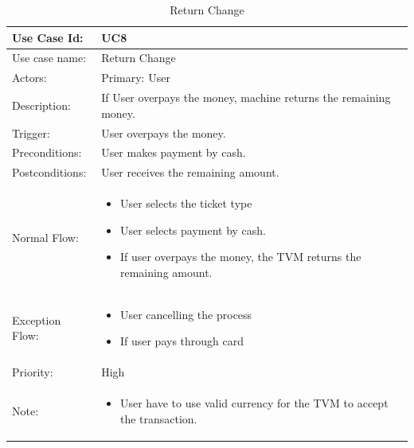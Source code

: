 \documentclass[11pt,oneside]{book}
\begin{document}
\begin{table}[h]
\centering
\begin{tabular}{|p{2.4cm}|p{11cm}|}
\hline
{Use Case Id: } & {UC8} \\
\hline
{Use case name:} & {Return Change}\\
\hline
{Actors: } & {Primary: User}\\
\hline
{Description:} & {If User overpays the money, machine returns the remaining money. }\\
\hline
 
{Trigger:  } & {User overpays the money.}\\
\hline
{Preconditions:  } & {User makes payment by cash.}\\
\hline
{Postconditions:} & {User receives the remaining amount.}\\
\hline
{Normal Flow: } & {
\begin{itemize}

\item	User selects the ticket type
\item	User selects payment by cash.
\item	If user overpays the money, the TVM returns the remaining amount.



 
\end{itemize}
}\\
\hline
{Exception Flow: } & {
\begin{itemize}

\item	User cancelling the process
\item	If user pays through card


\end{itemize}
}\\
\hline
{Priority:  } & {High}\\
\hline
{Note:  } & {
\begin{itemize}
\item	User have to use valid currency for the TVM to accept the transaction.

\end{itemize}
}\\
\hline
\end{tabular}
\caption{Return Change}
\end{table}
\end{document}
